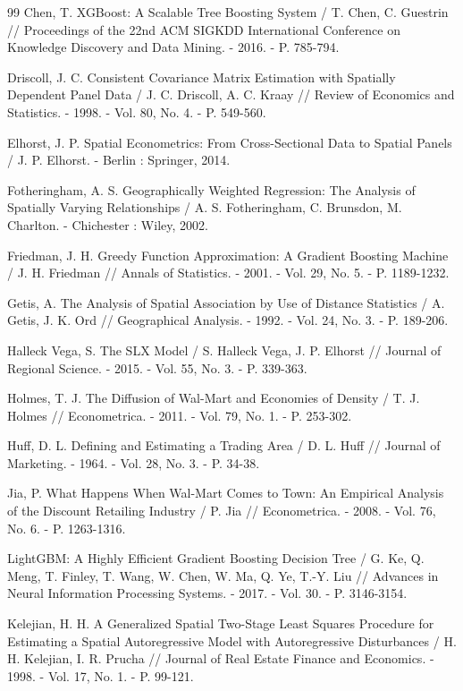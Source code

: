 \documentclass[12pt, a4paper]{article}
\begin{document}
\begin{thebibliography}{99}
    Chen, T. XGBoost: A Scalable Tree Boosting System / T. Chen, C. Guestrin // Proceedings of the 22nd ACM SIGKDD International Conference on Knowledge Discovery and Data Mining. - 2016. - P. 785-794.

    Driscoll, J. C. Consistent Covariance Matrix Estimation with Spatially Dependent Panel Data / J. C. Driscoll, A. C. Kraay // Review of Economics and Statistics. - 1998. - Vol. 80, No. 4. - P. 549-560.

    Elhorst, J. P. Spatial Econometrics: From Cross-Sectional Data to Spatial Panels / J. P. Elhorst. - Berlin : Springer, 2014.

    Fotheringham, A. S. Geographically Weighted Regression: The Analysis of Spatially Varying Relationships / A. S. Fotheringham, C. Brunsdon, M. Charlton. - Chichester : Wiley, 2002.

    Friedman, J. H. Greedy Function Approximation: A Gradient Boosting Machine / J. H. Friedman // Annals of Statistics. - 2001. - Vol. 29, No. 5. - P. 1189-1232.

    Getis, A. The Analysis of Spatial Association by Use of Distance Statistics / A. Getis, J. K. Ord // Geographical Analysis. - 1992. - Vol. 24, No. 3. - P. 189-206.

    Halleck Vega, S. The SLX Model / S. Halleck Vega, J. P. Elhorst // Journal of Regional Science. - 2015. - Vol. 55, No. 3. - P. 339-363.

    Holmes, T. J. The Diffusion of Wal-Mart and Economies of Density / T. J. Holmes // Econometrica. - 2011. - Vol. 79, No. 1. - P. 253-302.

    Huff, D. L. Defining and Estimating a Trading Area / D. L. Huff // Journal of Marketing. - 1964. - Vol. 28, No. 3. - P. 34-38.

    Jia, P. What Happens When Wal-Mart Comes to Town: An Empirical Analysis of the Discount Retailing Industry / P. Jia // Econometrica. - 2008. - Vol. 76, No. 6. - P. 1263-1316.

    LightGBM: A Highly Efficient Gradient Boosting Decision Tree / G. Ke, Q. Meng, T. Finley, T. Wang, W. Chen, W. Ma, Q. Ye, T.-Y. Liu // Advances in Neural Information Processing Systems. - 2017. - Vol. 30. - P. 3146-3154.

    Kelejian, H. H. A Generalized Spatial Two-Stage Least Squares Procedure for Estimating a Spatial Autoregressive Model with Autoregressive Disturbances / H. H. Kelejian, I. R. Prucha // Journal of Real Estate Finance and Economics. - 1998. - Vol. 17, No. 1. - P. 99-121.


\end{thebibliography}
\end{document}
